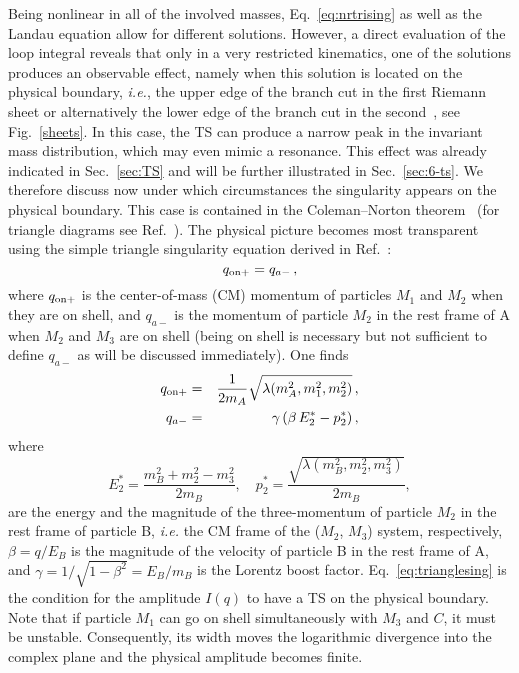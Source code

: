 Being nonlinear in all of the involved masses, Eq.~\eqref{eq:nrtrising} as well
as the Landau equation allow for different solutions. However, a direct
evaluation of the loop integral reveals that only in a very restricted
kinematics, one of the solutions produces an observable effect, namely
 when this solution is located on the physical
boundary, {\sl i.e.}, the upper edge of the branch cut in the first Riemann
sheet or alternatively the lower edge of the branch cut in the
second~\cite{Schmid:1967ojm}, see Fig.~\ref{sheets}. In this case, the TS can
produce a narrow peak in the invariant mass distribution, which may even mimic a
resonance. This effect
 was already indicated in Sec.~\ref{sec:TS} and will be further  illustrated  in
 Sec.~\ref{sec:6-ts}.
We therefore discuss now under which circumstances the singularity appears on
the physical boundary. This case is contained in the Coleman--Norton
theorem~\cite{Coleman:1965xm} (for triangle diagrams see
Ref.~\cite{Bronzan:1964zz}). The physical picture becomes most transparent using
the simple triangle singularity equation derived in Ref.~\cite{Bayar:2016ftu}:
\begin{equation}
  q_{\rm on+} = q_{a-}  \, ,
  \label{eq:trianglesing}
\end{equation}
where $q_{\rm on+}$
is the center-of-mass (CM) momentum of particles $M_1$ and $M_2$ when they are
on shell, and $q_{a-}$ is the momentum of particle $M_2$ in the rest frame
of A when $M_2$ and $M_3$ are on shell (being on shell is necessary but not
sufficient to define $q_{a-}$ as will be discussed immediately).
One finds
\begin{eqnarray}
  q_{{\rm on}+} &=& \frac1{2 m_A} \sqrt{\lambda(m_A^2,m_1^2,m_2^2)}\,,
  \nonumber\\
  q_{a-} &=& \gamma \left( \beta \, E_2^* - p_2^* \right) , 
\label{eq:qon}
\end{eqnarray}
where
\begin{equation}
  E_2^* = \frac{m_{B}^2+m_2^2-m_3^2}{2 m_{B}},\quad
  p_2^* = \frac{\sqrt{\lambda(m_{B}^2,m_2^2,m_3^2)}}{2 m_{B}},
\end{equation}
are the energy and the magnitude of the three-momentum of particle $M_2$ in the 
rest frame of particle B, {\sl i.e.} the CM frame of the ($M_2$, $M_3$) 
system, respectively, $\beta=q/E_B$ is the magnitude of the velocity of 
particle B in the rest frame of A, and $\gamma= 1/{\sqrt{1-\beta^2}} =
{E_{B}}/{m_{B}}$ is the Lorentz boost factor. 
Eq.~\eqref{eq:trianglesing} is the condition for the 
amplitude $I(q)$ to have a TS on the physical 
boundary. Note that if particle $M_1$ can go on shell
simultaneously with $M_3$ and $C$, it must be 
unstable. Consequently, its width 
moves the logarithmic divergence into the complex 
plane and the physical amplitude becomes finite.

